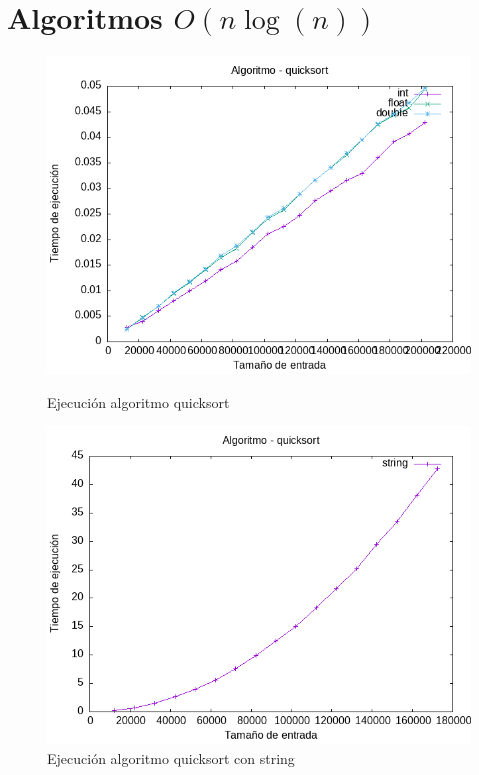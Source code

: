 \documentclass[11pt,openany]{book}
\begin{document}
\section{Algoritmos  \(O(n\log(n))\)}
\begin{figure}[H]
    \begin{minipage}{0.5\textwidth}
        \centering
        \includegraphics[width=\linewidth]{assets/Img/quicksort.png}
        \caption{Ejecución algoritmo quicksort}
        \label{fig:quicksort}
    \end{minipage}%
    \begin{minipage}{0.5\textwidth}
        \centering
        \includegraphics[width=\linewidth]{assets/Img/quicksortstring.png}
        \caption{Ejecución algoritmo quicksort con string}
        \label{fig:quicksortstring}
    \end{minipage}
\end{figure}
\end{document}
